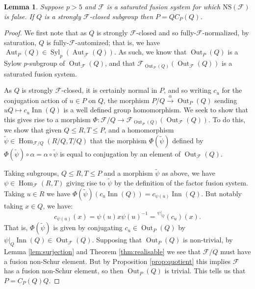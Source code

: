 \documentclass{amsart}
\theoremstyle{plain}\newtheorem{theorem}{Theorem}[section]
\theoremstyle{plain}\newtheorem{conjecture}[theorem]{Conjecture}
\theoremstyle{plain}\newtheorem{corollary}[theorem]{Corollary}
\theoremstyle{plain}\newtheorem{lemma}[theorem]{Lemma}
\theoremstyle{plain}\newtheorem{proposition}[theorem]{Proposition}
\theoremstyle{plain}\newtheorem{statement}[theorem]{}
\theoremstyle{definition}\newtheorem{definition}[theorem]{Definition}
\theoremstyle{definition}\newtheorem{example}[theorem]{Example}
\theoremstyle{definition}\newtheorem{examples}[theorem]{Examples}
\theoremstyle{definition}\newtheorem{notation}[theorem]{Notation}
\theoremstyle{definition}\newtheorem{remark}[theorem]{Remark}
\theoremstyle{definition}\newtheorem{remarks}[theorem]{Remarks}
\theoremstyle{definition}\newtheorem{question}[theorem]{Question}
\theoremstyle{definition}\newtheorem{propositiondefinition}[theorem]{Definition/Proposition}
\newcommand{\F}{\mathcal{F}}
\begin{document}
 \begin{lemma}\label{lem:stronglyclosed} Suppose $p > 5$ and $\mathcal{F}$ is a saturated fusion system for which $\mathrm{NS}(\mathcal{F})$ is false. If $Q$ is a strongly $\mathcal{F}$-closed subgroup then $P= QC_P(Q)$. 
 \end{lemma}
 \begin{proof}
    We first note that as $Q$ is strongly $\mathcal{F}$-closed and so fully-$\mathcal{F}$-normalized, by saturation, $Q$ is fully-$\F$-automized; that is, we have $\operatorname{Aut}_P(Q) \in \operatorname{Syl}_p(\operatorname{Aut}_\mathcal{F}(Q))$. As such, we know that $\operatorname{Out}_P(Q)$  is a Sylow $p$-subgroup of $\operatorname{Out}_\mathcal{F}(Q)$, and that $\mathcal{F}_{\operatorname{Out}_P(Q)}(\operatorname{Out}_\mathcal{F}(Q))$ is a saturated fusion system.
    
    As $Q$ is strongly $\mathcal{F}$-closed, it is certainly normal in $P$, and so writing $c_u$ for the conjugation action of $u\in P$ on $Q$, the morphism $P/Q \xrightarrow{\alpha} \operatorname{Out}_P(Q)$ sending $uQ \mapsto c_u\operatorname{Inn}(Q)$ is a well defined group homomorphism. We seek to show that this gives rise to a morphism $\Phi:\mathcal{F}/Q \rightarrow\mathcal{F}_{\operatorname{Out}_P(Q)}(\operatorname{Out}_\mathcal{F}(Q))$. To do this, we show that given $Q \leq R, T \leq P$, and a homomorphism $\tilde\psi \in \operatorname{Hom}_{\F/Q}(R/Q,T/Q)$ that the morphism $\Phi(\tilde\psi)$ defined by $\Phi(\tilde\psi) \circ \alpha = \alpha \circ \tilde\psi$ is equal to conjugation by an element of $\operatorname{Out}_\mathcal{F}(Q)$.

    Taking subgroups, $Q \leq R, T \leq P$ and a morphism $\tilde\psi$ as above, we have $\psi \in \operatorname{Hom}_{\mathcal{F}}(R,T)$ giving rise to $\tilde\psi$ by the definition of the factor fusion system. Taking $u \in R$ we have $\Phi(\tilde\psi)(c_{u}\operatorname{Inn}(Q)) = c_{\psi(u)}\operatorname{Inn}(Q)$. But notably taking $x \in Q$, we have:
    $$ c_{\psi(u)}(x) = \psi(u)x \psi(u)^{-1} =  \hspace{0pt}^{\psi|_{Q}}(c_u)(x).$$
    That is, $\Phi(\tilde\psi)$ is given by conjugating $c_u \in \operatorname{Out}_P(Q)$ by $\psi|_{Q}\operatorname{Inn}(Q) \in \operatorname{Out}_{\mathcal{F}}(Q)$. Supposing that $\operatorname{Out}_P(Q)$ is non-trivial, by Lemma \ref{lem:surjection} and Theorem \ref{thm:realisable} we see that $\mathcal{F}/Q$ must have a fusion non-Schur element. But by Proposition \ref{prop:quotient} this implies $\mathcal{F}$ has a fusion non-Schur element, so then $\operatorname{Out}_P(Q)$ is trivial. This tells us that $P= C_P(Q)Q$.
 \end{proof}
\end{document}
